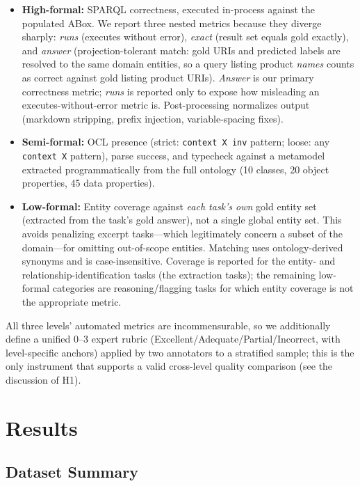 \documentclass[runningheads]{llncs}
\begin{document}
\begin{itemize}[noitemsep]
  \item \textbf{High-formal:} SPARQL correctness, executed in-process against the populated ABox. We report three nested metrics because they diverge sharply: \emph{runs} (executes without error), \emph{exact} (result set equals gold exactly), and \emph{answer} (projection-tolerant match: gold URIs and predicted labels are resolved to the same domain entities, so a query listing product \emph{names} counts as correct against gold listing product URIs). \emph{Answer} is our primary correctness metric; \emph{runs} is reported only to expose how misleading an executes-without-error metric is. Post-processing normalizes output (markdown stripping, prefix injection, variable-spacing fixes).
  \item \textbf{Semi-formal:} OCL presence (strict: \texttt{context X inv} pattern; loose: any \texttt{context X} pattern), parse success, and typecheck against a metamodel extracted programmatically from the full ontology (10 classes, 20 object properties, 45 data properties).
  \item \textbf{Low-formal:} Entity coverage against \emph{each task's own} gold entity set (extracted from the task's gold answer), not a single global entity set. This avoids penalizing excerpt tasks---which legitimately concern a subset of the domain---for omitting out-of-scope entities. Matching uses ontology-derived synonyms and is case-insensitive. Coverage is reported for the entity- and relationship-identification tasks (the extraction tasks); the remaining low-formal categories are reasoning/flagging tasks for which entity coverage is not the appropriate metric.
\end{itemize}

All three levels' automated metrics are incommensurable, so we additionally define a unified 0--3 expert rubric (Excellent/Adequate/Partial/Incorrect, with level-specific anchors) applied by two annotators to a stratified sample; this is the only instrument that supports a valid cross-level quality comparison (see the discussion of H1).

\section{Results}
\label{sec:results}

\subsection{Dataset Summary}
\end{document}
